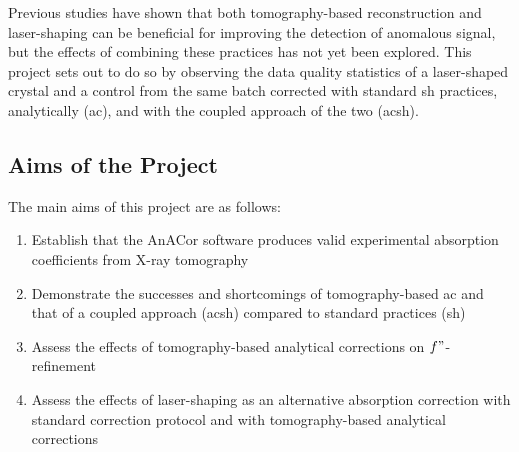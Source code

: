 Previous studies have shown that both tomography-based reconstruction and laser-shaping can be beneficial for improving the detection of anomalous signal, but the effects of combining these practices has not yet been explored. This project sets out to do so by observing the data quality statistics of a laser-shaped crystal and a control from the same batch corrected with standard \ac{sh} practices, analytically (\ac{ac}), and with the coupled approach of the two (\ac{acsh}).

\subsection{Aims of the Project} %

The main aims of this project are as follows:

\begin{enumerate}
    \item Establish that the AnACor software produces valid experimental absorption coefficients from X-ray tomography
    \item Demonstrate the successes and shortcomings of tomography-based \ac{ac} and that of a coupled approach (\ac{acsh}) compared to standard practices (\ac{sh})
    \item Assess the effects of tomography-based analytical corrections on $f"$-refinement
    \item Assess the effects of laser-shaping as an alternative absorption correction with standard correction protocol and with tomography-based analytical corrections
\end{enumerate}